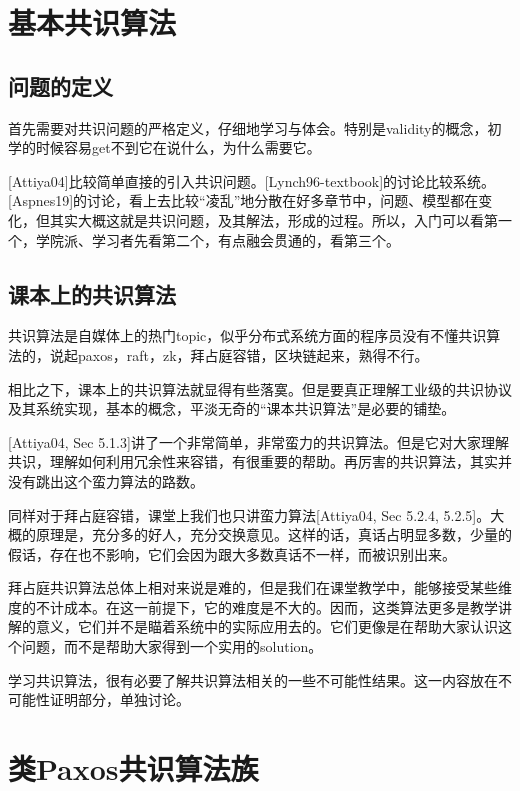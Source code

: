 \documentclass[UTF8]{ctexrep}
\begin{document}
\chapter{基本共识算法}

\section{问题的定义}

首先需要对共识问题的严格定义，仔细地学习与体会。特别是validity的概念，初学的时候容易get不到它在说什么，为什么需要它。

[Attiya04]比较简单直接的引入共识问题。[Lynch96-textbook]的讨论比较系统。[Aspnes19]的讨论，看上去比较“凌乱”地分散在好多章节中，问题、模型都在变化，但其实大概这就是共识问题，及其解法，形成的过程。所以，入门可以看第一个，学院派、学习者先看第二个，有点融会贯通的，看第三个。

\section{课本上的共识算法}

共识算法是自媒体上的热门topic，似乎分布式系统方面的程序员没有不懂共识算法的，说起paxos，raft，zk，拜占庭容错，区块链起来，熟得不行。

相比之下，课本上的共识算法就显得有些落寞。但是要真正理解工业级的共识协议及其系统实现，基本的概念，平淡无奇的“课本共识算法”是必要的铺垫。

[Attiya04, Sec 5.1.3]讲了一个非常简单，非常蛮力的共识算法。但是它对大家理解共识，理解如何利用冗余性来容错，有很重要的帮助。再厉害的共识算法，其实并没有跳出这个蛮力算法的路数。

同样对于拜占庭容错，课堂上我们也只讲蛮力算法[Attiya04, Sec 5.2.4, 5.2.5]。大概的原理是，充分多的好人，充分交换意见。这样的话，真话占明显多数，少量的假话，存在也不影响，它们会因为跟大多数真话不一样，而被识别出来。

拜占庭共识算法总体上相对来说是难的，但是我们在课堂教学中，能够接受某些维度的不计成本。在这一前提下，它的难度是不大的。因而，这类算法更多是教学讲解的意义，它们并不是瞄着系统中的实际应用去的。它们更像是在帮助大家认识这个问题，而不是帮助大家得到一个实用的solution。

学习共识算法，很有必要了解共识算法相关的一些不可能性结果。这一内容放在不可能性证明部分，单独讨论。


\chapter{类Paxos共识算法族}
\end{document}
